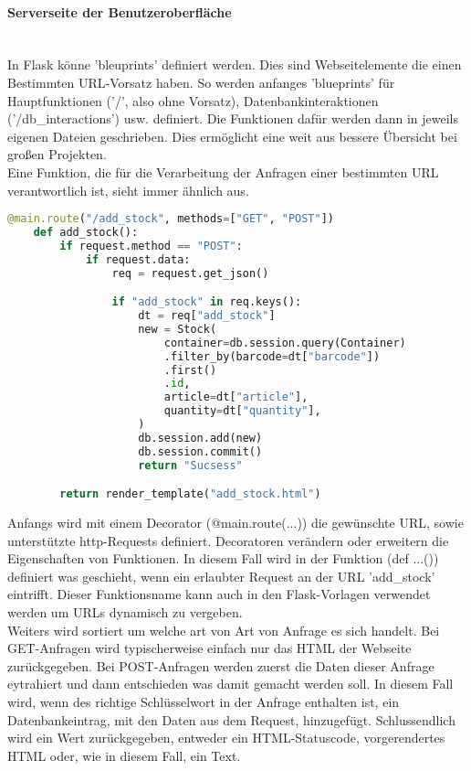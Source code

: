 \paragraph{Serverseite der Benutzeroberfläche}\mbox{}\\
In Flask könne 'bleuprints' definiert werden. Dies sind Webseitelemente die einen Bestimmten URL-Vorsatz haben. So werden anfanges 'blueprints' für Hauptfunktionen ('/', also ohne Vorsatz), Datenbankinteraktionen ('/db\_interactions') usw. definiert. Die Funktionen dafür werden dann in jeweils eigenen Dateien geschrieben. Dies ermöglicht eine weit aus bessere Übersicht bei großen Projekten. \\
Eine Funktion, die für die Verarbeitung der Anfragen einer bestimmten URL verantwortlich ist, sieht immer ähnlich aus.

\begin{lstlisting}[language=Python]
    @main.route("/add_stock", methods=["GET", "POST"])
    def add_stock():
        if request.method == "POST":
            if request.data:
                req = request.get_json()

                if "add_stock" in req.keys():
                    dt = req["add_stock"]
                    new = Stock(
                        container=db.session.query(Container)
                        .filter_by(barcode=dt["barcode"])
                        .first()
                        .id,
                        article=dt["article"],
                        quantity=dt["quantity"],
                    )
                    db.session.add(new)
                    db.session.commit()
                    return "Sucsess"

        return render_template("add_stock.html")
\end{lstlisting}  

Anfangs wird mit einem Decorator (@main.route(...)) die gewünschte URL, sowie unterstützte http-Requests definiert. Decoratoren verändern oder erweitern die Eigenschaften von Funktionen. In diesem Fall wird in der Funktion (def ...()) definiert was geschieht, wenn ein erlaubter Request an der URL 'add\_stock' eintrifft. Dieser Funktionsname kann auch in den Flask-Vorlagen verwendet werden um URLs dynamisch zu vergeben.\\
Weiters wird sortiert um welche art von Art von Anfrage es sich handelt. Bei GET-Anfragen wird typischerweise einfach nur das HTML der Webseite zurückgegeben. Bei POST-Anfragen werden zuerst die Daten dieser Anfrage eytrahiert und dann entschieden was damit gemacht werden soll. In diesem Fall wird, wenn des richtige Schlüsselwort in der Anfrage enthalten ist, ein Datenbankeintrag, mit den Daten aus dem Request, hinzugefügt. Schlussendlich wird ein Wert zurückgegeben, entweder ein HTML-Statuscode, vorgerendertes HTML oder, wie in diesem Fall, ein Text.

